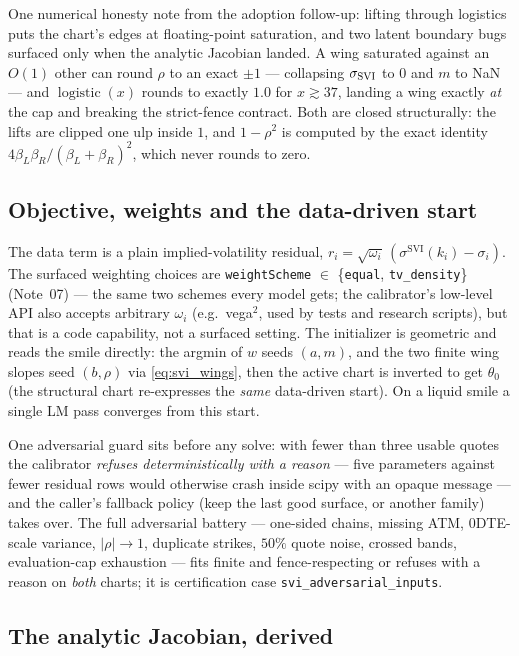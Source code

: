 \documentclass[11pt]{article}
\begin{document}
One numerical honesty note from the adoption follow-up: lifting through
logistics puts the chart's edges at floating-point saturation, and two latent
boundary bugs surfaced only when the analytic Jacobian landed. A wing
saturated against an $O(1)$ other can round $\rho$ to an exact $\pm1$ ---
collapsing $\sigma_{\mathrm{SVI}}$ to $0$ and $m$ to NaN --- and $\operatorname{logistic}(x)$
rounds to exactly $1.0$ for $x\gtrsim37$, landing a wing exactly \emph{at}
the cap and breaking the strict-fence contract. Both are closed structurally:
the lifts are clipped one ulp inside $1$, and $1-\rho^2$ is computed by the
exact identity $4\beta_L\beta_R/(\beta_L+\beta_R)^2$, which never rounds to
zero.

\subsection{Objective, weights and the data-driven start}

The data term is a plain implied-volatility residual,
$r_i=\sqrt{\omega_i}\,(\sigma^{\text{SVI}}(k_i)-\sigma_i)$. The surfaced
weighting choices are \texttt{weightScheme} $\in$ \{\texttt{equal},
\texttt{tv\_density}\} (Note~07) --- the same two schemes every model gets;
the calibrator's low-level API also accepts arbitrary $\omega_i$ (e.g.\
vega$^2$, used by tests and research scripts), but that is a code capability,
not a surfaced setting. The initializer is geometric and reads the smile
directly: the argmin of $w$ seeds $(a,m)$, and the two finite wing slopes seed
$(b,\rho)$ via \eqref{eq:svi_wings}, then the active chart is inverted to get
$\theta_0$ (the structural chart re-expresses the \emph{same} data-driven
start). On a liquid smile a single LM pass converges from this start.

One adversarial guard sits before any solve: with fewer than three usable
quotes the calibrator \emph{refuses deterministically with a reason} --- five
parameters against fewer residual rows would otherwise crash inside scipy
with an opaque message --- and the caller's fallback policy (keep the last
good surface, or another family) takes over. The full adversarial battery
--- one-sided chains, missing ATM, 0DTE-scale variance, $|\rho|\to1$,
duplicate strikes, $50\%$ quote noise, crossed bands, evaluation-cap
exhaustion --- fits finite and fence-respecting or refuses with a reason on
\emph{both} charts; it is certification case
\texttt{svi\_adversarial\_inputs}.

\subsection{The analytic Jacobian, derived}
\label{sec:jacobian}
\end{document}
